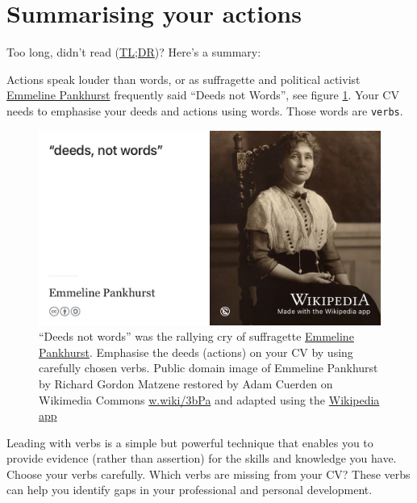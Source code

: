 \documentclass[
]{book}
\begin{document}
\hypertarget{summarising-your-actions}{%
\section{Summarising your actions}\label{summarising-your-actions}}

Too long, didn't read (\href{https://en.wiktionary.org/wiki/too_long;_didn\%27t_read}{TL;DR})? Here's a summary:

Actions speak louder than words, or as suffragette and political activist \href{https://en.wikipedia.org/wiki/Emmeline_Pankhurst}{Emmeline Pankhurst} frequently said ``Deeds not Words'', see figure \ref{fig:pankhurst-fig}. Your CV needs to emphasise your deeds and actions using words. Those words are \texttt{verbs}.

\begin{figure}

{\centering \includegraphics[width=1\linewidth]{images/deeds-not-words-pankhurst} 

}

\caption{``Deeds not words'' was the rallying cry of suffragette \href{https://en.wikipedia.org/wiki/Emmeline_Pankhurst}{Emmeline Pankhurst}. Emphasise the deeds (actions) on your CV by using carefully chosen verbs. Public domain image of Emmeline Pankhurst by Richard Gordon Matzene restored by Adam Cuerden on Wikimedia Commons \href{https://w.wiki/3bPa}{w.wiki/3bPa} and adapted using the \href{https://apps.apple.com/gb/app/wikipedia/id324715238}{Wikipedia app}}\label{fig:pankhurst-fig}
\end{figure}



Leading with verbs is a simple but powerful technique that enables you to provide evidence (rather than assertion) for the skills and knowledge you have. Choose your verbs carefully. Which verbs are missing from your CV? These verbs can help you identify gaps in your professional and personal development.
\end{document}

